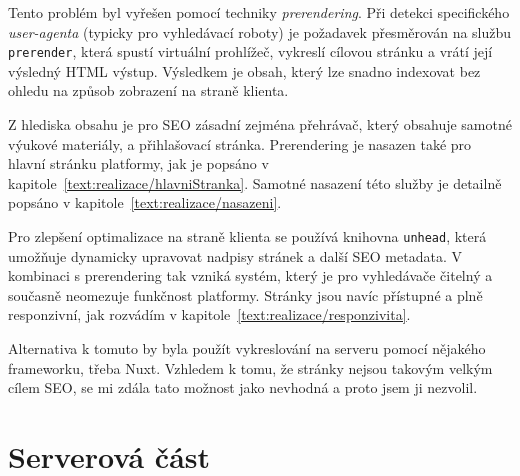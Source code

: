 Tento problém byl vyřešen pomocí techniky \textit{prerendering}.
Při detekci specifického \textit{user-agenta} (typicky pro vyhledávací roboty) je požadavek přesměrován na službu \texttt{prerender}, která spustí virtuální prohlížeč, vykreslí cílovou stránku a vrátí její výsledný HTML výstup.
Výsledkem je obsah, který lze snadno indexovat bez ohledu na způsob zobrazení na straně klienta.

Z hlediska obsahu je pro SEO zásadní zejména přehrávač, který obsahuje samotné výukové materiály, a přihlašovací stránka. 
Prerendering je nasazen také pro hlavní stránku platformy, jak je popsáno v kapitole~\ref{text:realizace/hlavniStranka}. 
Samotné nasazení této služby je detailně popsáno v kapitole~\ref{text:realizace/nasazeni}.

Pro zlepšení optimalizace na straně klienta se používá knihovna \texttt{unhead}, která umožňuje dynamicky upravovat nadpisy stránek a další SEO metadata. 
V kombinaci s prerendering tak vzniká systém, který je pro vyhledávače čitelný a současně neomezuje funkčnost platformy. 
Stránky jsou navíc přístupné a plně responzivní, jak rozvádím v kapitole~\ref{text:realizace/responzivita}.

Alternativa k tomuto by byla použít vykreslování na serveru pomocí nějakého frameworku, třeba Nuxt.
Vzhledem k tomu, že stránky nejsou takovým velkým cílem SEO, se mi zdála tato možnost jako nevhodná a proto jsem ji nezvolil.



\section{Serverová část}\label{text:realizace/server}

